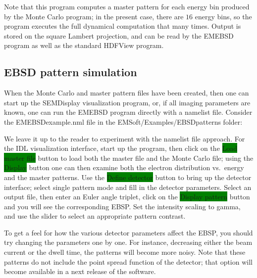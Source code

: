 \documentclass[DIV=calc, paper=letter, fontsize=11pt]{scrartcl}	 %
\newcommand{\button}[1]{\colorbox{green}{\textsf{#1}} button}
\begin{document}
Note that this program computes a master pattern for each energy bin produced by the Monte Carlo program; in the
present case, there are $16$ energy bins, so the program executes the full dynamical computation that many times.
Output is stored on the square Lambert projection, and can be read by the \textsf{EMEBSD} program as well as
the standard HDFView program.

\subsection{EBSD pattern simulation}
When the Monte Carlo and master pattern files have been created, then one can start up the 
\textsf{SEMDisplay} visualization program, or, if all imaging parameters are known, one can
run the \textsf{EMEBSD} program directly with a namelist file.  Consider 
the EMEBSDexample.nml file in the EMSoft/Examples/EBSDpatterns folder:

We leave it up to the reader to experiment with the namelist file approach.  For the IDL visualization interface, 
start up the program, then click on the \button{Load master file} to load both the master file and the Monte Carlo
file; using the \button{Display} one can then examine both the electron distribution vs.\ energy and the master
patterns.  Use the \button{Define detector} to bring up the detector interface; select \textsf{single pattern} mode
and fill in the detector parameters.  Select an output file, then enter an Euler angle triplet, click on the
\button{Display pattern} and you will see the corresponding EBSP.  Set the intensity scaling to gamma, and 
use the slider to select an appropriate pattern contrast.

To get a feel for how the various detector parameters affect the EBSP, you should try changing the parameters 
one by one.  For instance, decreasing either the beam current or the dwell time, the patterns will become more
noisy.  Note that these patterns do not include the point spread function of the detector; that option will become 
available in a next release of the software.
\end{document}
